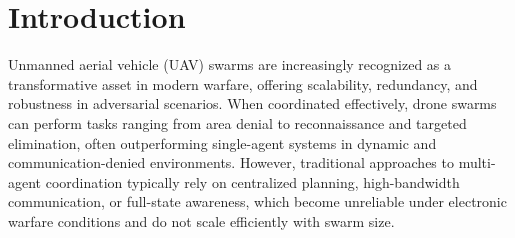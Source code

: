 \section{Introduction}
    Unmanned aerial vehicle (UAV) swarms are increasingly recognized as a transformative asset in modern warfare, offering scalability, redundancy, and robustness in adversarial scenarios. When coordinated effectively, drone swarms can perform tasks ranging from area denial to reconnaissance and targeted elimination, often outperforming single-agent systems in dynamic and communication-denied environments. However, traditional approaches to multi-agent coordination typically rely on centralized planning, high-bandwidth communication, or full-state awareness, which become unreliable under electronic warfare conditions and do not scale efficiently with swarm size.
    \medskip